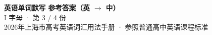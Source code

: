 \documentclass[10pt,a4paper]{article}
\begin{document}
\pagestyle{plain}

\begin{center}
{\LARGE\bfseries 英语单词默写 \quad 参考答案（英 $\to$ 中）}\\[0.22em]
{\large I 字母 · 第 3 / 4 份}\\[0.18em]
{\small 2026年上海市高考英语词汇用法手册 · 参照普通高中英语课程标准}
\end{center}

\vspace{0.2em}
\noindent{\color{rulegray}\rule{\textwidth}{0.8pt}}

\vspace{0.35em}

\vspace{0.25em}
\renewcommand{\arraystretch}{1.32}
\end{document}
